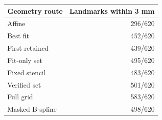 \begin{tabular}{@{}lr@{}}
\toprule
Geometry route & Landmarks within 3 mm \\
\midrule
Affine & 296/620 \\
Best fit & 452/620 \\
First retained & 439/620 \\
Fit-only set & 495/620 \\
Fixed stencil & 483/620 \\
Verified set & 501/620 \\
Full grid & 583/620 \\
Masked B-spline & 498/620 \\
\bottomrule
\end{tabular}
